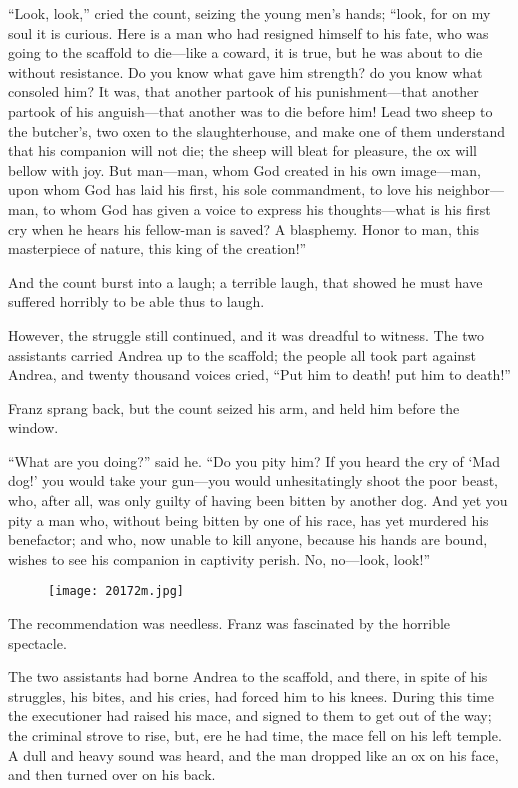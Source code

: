 “Look, look,” cried the count, seizing the young men’s hands; “look,
for on my soul it is curious. Here is a man who had resigned himself to
his fate, who was going to the scaffold to die—like a coward, it is
true, but he was about to die without resistance. Do you know what gave
him strength? do you know what consoled him? It was, that another
partook of his punishment—that another partook of his anguish—that
another was to die before him! Lead two sheep to the butcher’s, two
oxen to the slaughterhouse, and make one of them understand that his
companion will not die; the sheep will bleat for pleasure, the ox will
bellow with joy. But man—man, whom God created in his own image—man,
upon whom God has laid his first, his sole commandment, to love his
neighbor—man, to whom God has given a voice to express his
thoughts—what is his first cry when he hears his fellow-man is saved? A
blasphemy. Honor to man, this masterpiece of nature, this king of the
creation!”

And the count burst into a laugh; a terrible laugh, that showed he must
have suffered horribly to be able thus to laugh.

However, the struggle still continued, and it was dreadful to witness.
The two assistants carried Andrea up to the scaffold; the people all
took part against Andrea, and twenty thousand voices cried, “Put him to
death! put him to death!”

Franz sprang back, but the count seized his arm, and held him before
the window.

“What are you doing?” said he. “Do you pity him? If you heard the cry
of ‘Mad dog!’ you would take your gun—you would unhesitatingly shoot
the poor beast, who, after all, was only guilty of having been bitten
by another dog. And yet you pity a man who, without being bitten by one
of his race, has yet murdered his benefactor; and who, now unable to
kill anyone, because his hands are bound, wishes to see his companion
in captivity perish. No, no—look, look!”

\begin{figure}[h]
\texttt{[image: 20172m.jpg]}
\end{figure}

The recommendation was needless. Franz was fascinated by the horrible
spectacle.

The two assistants had borne Andrea to the scaffold, and there, in
spite of his struggles, his bites, and his cries, had forced him to his
knees. During this time the executioner had raised his mace, and signed
to them to get out of the way; the criminal strove to rise, but, ere he
had time, the mace fell on his left temple. A dull and heavy sound was
heard, and the man dropped like an ox on his face, and then turned over
on his back.

